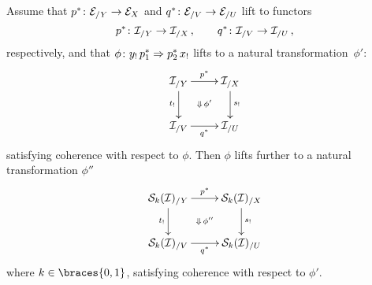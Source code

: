 \documentclass[reqno,10pt,a4paper,oneside,draft]{amsart}
\begin{document}
\begin{lemma} \label{strong-h-equiv-base-change-along-fibration-BC}
Assume that $p^* \colon \mathcal{E}_{/Y} \to \mathcal{E}_{X}$ and $q^* \colon \mathcal{E}_{/V} \to \mathcal{E}_{/U}$ lift to functors
\[
  p^* \colon \mathcal{I}_{/Y} \to \mathcal{I}_{/X}
\, , \qquad
  q^* \colon \mathcal{I}_{/V} \to \mathcal{I}_{/U}
\, ,
\]
respectively, and that  $\phi \colon y_! \, p_1^* \Rightarrow p_2^* \, x_{!}$ lifts to a natural transformation~$\phi'$:
\begin{equation} \label{strong-h-equiv-base-change-along-fibration-BC:2}
\begin{gathered}
\xymatrix{
  \cal{I}_{/Y}
  \ar[r]^{p^*} 
  \ar[d]_{t_!}
  \ar@{}[dr]|{\Downarrow \, \phi'}
&
  \cal{I}_{/X}
  \ar[d]^{s_!}
\\
  \cal{I}_{/V}
  \ar[r]_{q^*} 
&
  \cal{I}_{/U}
}
\end{gathered}
\end{equation}
satisfying coherence with respect to $\phi$. 
Then $\phi$ lifts further to a natural transformation $\phi''$ 
\begin{equation} \label{strong-h-equiv-base-change-along-fibration-BC:3}
\begin{gathered}
\xymatrix{
  \cal{S}_k(\cal{I})_{/Y}
  \ar[r]^{p^*} 
  \ar[d]_{t_!}
  \ar@{}[dr]|{\Downarrow \, \phi''}
&
  \cal{S}_k(\cal{I})_{/X}
  \ar[d]^{s_!}
\\
  \cal{S}_k(\cal{I})_{/V}
  \ar[r]_{q^*} 
&
  \cal{S}_k(\cal{I})_{/U}
}
\end{gathered}
\end{equation}
where $k \in \braces{0, 1}$, satisfying coherence with respect to $\phi'$.
\end{lemma}
\end{document}
